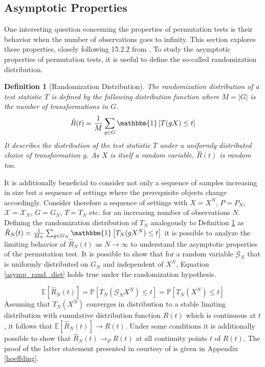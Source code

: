 \documentclass[12pt, a4paper]{article}
\theoremstyle{MAstyle} \newtheorem{assumption}{Assumption}[section]
\theoremstyle{MAstyle} \newtheorem{definition}{Definition}[section]
\theoremstyle{MAstyle} \newtheorem{theorem}{Theorem}[section]
\begin{document}
		\subsection{Asymptotic Properties}\label{perm_asymp}
			One interesting question concerning the properties of permutation tests is their behavior when the number of observations goes to infinity. This section explores these properties, closely following 15.2.2 from \cite{lehmann_testing_2005}. 		
			To study the asymptotic properties of permutation tests, it is useful to define the so-called randomization distribution.
			\begin{definition}[Randomization Distribution]\label{rand_dist}
				The randomization distribution of a test statistic $T$ is defined by the following distribution function where $M = \vert G \vert$ is the number of transformations in $G$.
				$$\hat{R}(t) = \frac{1}{M} \sum_{g \in G} \mathbbm{1} \left[T(gX) \leq t\right]$$
				It describes the distribution of the test statistic $T$ under a uniformly distributed choice of transformation $g$. As $X$ is itself a random variable, $\hat{R}(t)$ is random too. 
			\end{definition}
		
			It is additionally beneficial to consider not only a sequence of samples increasing in size but a sequence of settings where the prerequisite objects change accordingly. 
			Consider therefore a sequence of settings with $X = X^N$, $P = P_N$, $\mathcal{X} = \mathcal{X}_N$, $G = G_N$, $T = T_N$ etc. for an increasing number of observations $N$.
			Defining the randomization distribution of $T_N$ analogously to Definition \ref{rand_dist} as $\hat{R}_N(t) = \frac{1}{M_N} \sum_{g \in G_N} \mathbbm{1} \left[T_N(gX^N) \leq t\right]$ it is possible to analyze the limiting behavior of $\hat{R}_N(t)$ as $N \rightarrow \infty$ to understand the asymptotic properties of the permutation test.
			It is possible to show that for a random variable $\mathcal{G}_N$ that is uniformly distributed on $G_N$ and independent of $X^N$, Equation \ref{asymp_rand_dist} holds true under the randomization hypothesis.
			
			\begin{equation}\label{asymp_rand_dist}
				\mathbb{E}[\hat{R}_N(t)] = \mathbb{P}\left[T_N(\mathcal{G}_NX^N) \leq t\right] = \mathbb{P}\left[T_N(X^N) \leq t\right]
			\end{equation}
			Assuming that $T_N(X^N)$ converges in distribution to a stable limiting distribution with cumulative distribution function $R(t)$ which is continuous at $t$, it follows that $\mathbb{E}[\hat{R}_N(t)] \rightarrow R(t)$. Under some conditions it is additionally possible to show that  $\hat{R}_N(t) \rightarrow_P R(t)$ at all continuity points $t$ of $R(t)$. The proof of the latter statement presented in \cite{lehmann_testing_2005} courtesy of \cite{hoeffding_large-sample_1952} is given in Appendix \ref{hoeffding}.\\
			
\end{document}

